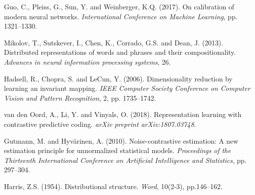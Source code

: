 \documentclass[11pt,a4paper]{article}
\begin{document}
\begin{thebibliography}{}
		Guo, C., Pleiss, G., Sun, Y. and Weinberger, K.Q. (2017).
		On calibration of modern neural networks.
		\textit{International Conference on Machine Learning}, pp. 1321--1330.
		
		Mikolov, T., Sutskever, I., Chen, K., Corrado, G.S. and Dean, J. (2013).
		Distributed representations of words and phrases and their compositionality.
		\textit{Advances in neural information processing systems}, 26.
		
		Hadsell, R., Chopra, S. and LeCun, Y. (2006).
		Dimensionality reduction by learning an invariant mapping.
		\textit{IEEE Computer Society Conference on Computer Vision and Pattern Recognition}, 2, pp. 1735--1742.
		
		van den Oord, A., Li, Y. and Vinyals, O. (2018).
		Representation learning with contrastive predictive coding.
		\textit{arXiv preprint arXiv:1807.03748}.
		
		Gutmann, M. and Hyv{\"a}rinen, A. (2010).
		Noise-contrastive estimation: A new estimation principle for unnormalized statistical models.
		\textit{Proceedings of the Thirteenth International Conference on Artificial Intelligence and Statistics}, pp. 297--304.
		
		Harris, Z.S. (1954).
		Distributional structure.
		\textit{Word}, 10(2-3), pp.146--162.
		
	\end{thebibliography}
\end{document}
